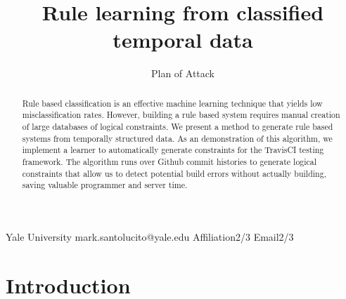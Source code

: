 \documentclass{sigplanconf}
\begin{document}
\setlength{\pdfpageheight}{\paperheight}\setlength{\pdfpagewidth}{\paperwidth}
   




\title{Rule learning from classified temporal data}
\subtitle{Plan of Attack}

           {Yale University}           {mark.santolucito@yale.edu}
           {Affiliation2/3}           {Email2/3}

\maketitle

\begin{abstract}
Rule based classification is an effective machine learning technique that yields low misclassification rates.
However, building a rule based system requires manual creation of large databases of logical constraints.
We present a method to generate rule based systems from temporally structured data.
As an demonstration of this algorithm, we implement a learner to automatically generate constraints for the TravisCI testing framework.
The algorithm runs over Github commit histories to generate logical constraints that allow us to detect potential build errors without actually building, saving valuable programmer and server time.
\end{abstract}



\section{Introduction}
\end{document}
